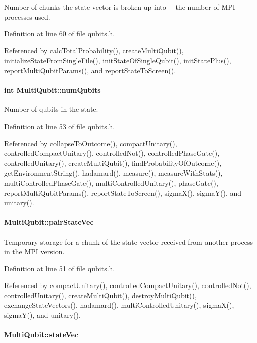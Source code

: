 Number of chunks the state vector is broken up into -\/-\/ the number of MPI processes used. 

Definition at line 60 of file qubits.h.

Referenced by calcTotalProbability(), createMultiQubit(), initializeStateFromSingleFile(), initStateOfSingleQubit(), initStatePlus(), reportMultiQubitParams(), and reportStateToScreen().\hypertarget{structMultiQubit_ab5b9795bdc6fb5855e1974dcbbaeb36f}{
\paragraph[{numQubits}]{\setlength{\rightskip}{0pt plus 5cm}int {\bf MultiQubit::numQubits}}\hfill}
\label{structMultiQubit_ab5b9795bdc6fb5855e1974dcbbaeb36f}


Number of qubits in the state. 

Definition at line 53 of file qubits.h.

Referenced by collapseToOutcome(), compactUnitary(), controlledCompactUnitary(), controlledNot(), controlledPhaseGate(), controlledUnitary(), createMultiQubit(), findProbabilityOfOutcome(), getEnvironmentString(), hadamard(), measure(), measureWithStats(), multiControlledPhaseGate(), multiControlledUnitary(), phaseGate(), reportMultiQubitParams(), reportStateToScreen(), sigmaX(), sigmaY(), and unitary().\hypertarget{structMultiQubit_a76f7db4eab52d2b30f58f973ada809c5}{
\paragraph[{pairStateVec}]{ {\bf MultiQubit::pairStateVec}}\hfill}
\label{structMultiQubit_a76f7db4eab52d2b30f58f973ada809c5}


Temporary storage for a chunk of the state vector received from another process in the MPI version. 

Definition at line 51 of file qubits.h.

Referenced by compactUnitary(), controlledCompactUnitary(), controlledNot(), controlledUnitary(), createMultiQubit(), destroyMultiQubit(), exchangeStateVectors(), hadamard(), multiControlledUnitary(), sigmaX(), sigmaY(), and unitary().\hypertarget{structMultiQubit_a45483190d6b01ef6b2f98f2bec9ab94f}{
\paragraph[{stateVec}]{ {\bf MultiQubit::stateVec}}\hfill}
\label{structMultiQubit_a45483190d6b01ef6b2f98f2bec9ab94f}



